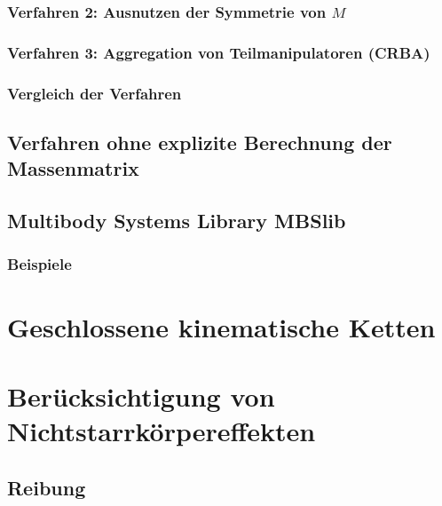 \documentclass[a4paper, 11pt, accentcolor = tud3b]{tudreport}
\begin{document}
				\subsubsection{Verfahren 2: Ausnutzen der Symmetrie von \(M\)} %

				\subsubsection{Verfahren 3: Aggregation von Teilmanipulatoren (CRBA)} %

				\subsubsection{Vergleich der Verfahren} %

			\subsection{Verfahren ohne explizite Berechnung der Massenmatrix} %

			\subsection{Multibody Systems Library MBSlib} %

				\subsubsection{Beispiele} %

		\section{Geschlossene kinematische Ketten} %

		\section{Berücksichtigung von Nichtstarrkörpereffekten} %

			\subsection{Reibung} %
\end{document}

